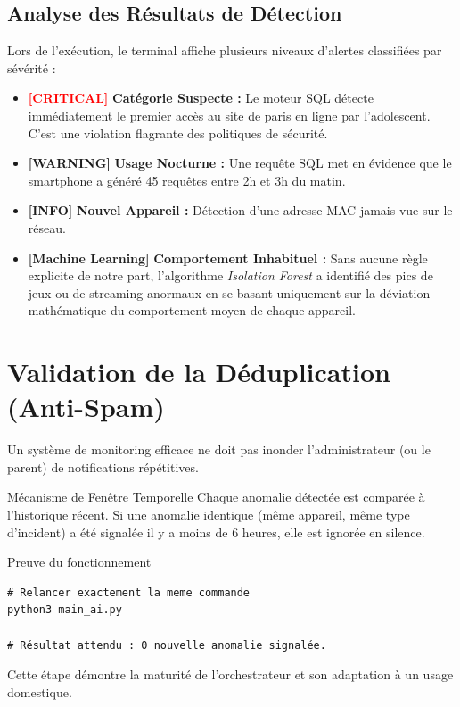 \documentclass[11pt,a4paper]{article}
\begin{document}
\subsection{Analyse des Résultats de Détection}

Lors de l'exécution, le terminal affiche plusieurs niveaux d'alertes classifiées par sévérité :

\begin{itemize}
    \item \textbf{\textcolor{red}{[CRITICAL]}} \textbf{Catégorie Suspecte :} Le moteur SQL détecte immédiatement le premier accès au site de paris en ligne par l'adolescent. C'est une violation flagrante des politiques de sécurité.
    \item \textbf{\textcolor{codeorange}{[WARNING]}} \textbf{Usage Nocturne :} Une requête SQL met en évidence que le smartphone a généré 45 requêtes entre 2h et 3h du matin.
    \item \textbf{\textcolor{blueTN}{[INFO]}} \textbf{Nouvel Appareil :} Détection d'une adresse MAC jamais vue sur le réseau.
    \item \textbf{\textcolor{codegreen}{[Machine Learning]}} \textbf{Comportement Inhabituel :} Sans aucune règle explicite de notre part, l'algorithme \textit{Isolation Forest} a identifié des pics de jeux ou de streaming anormaux en se basant uniquement sur la déviation mathématique du comportement moyen de chaque appareil.
\end{itemize}

\section{Validation de la Déduplication (Anti-Spam)}

Un système de monitoring efficace ne doit pas inonder l'administrateur (ou le parent) de notifications répétitives.

\begin{infocadre}{Mécanisme de Fenêtre Temporelle}
Chaque anomalie détectée est comparée à l'historique récent. Si une anomalie identique (même appareil, même type d'incident) a été signalée il y a moins de 6 heures, elle est ignorée en silence.
\end{infocadre}

\begin{stepcadre}{Preuve du fonctionnement}
\begin{lstlisting}[language=BashShell]
# Relancer exactement la meme commande
python3 main_ai.py

# Résultat attendu : 0 nouvelle anomalie signalée.
\end{lstlisting}
\end{stepcadre}
Cette étape démontre la maturité de l'orchestrateur et son adaptation à un usage domestique.
\end{document}
